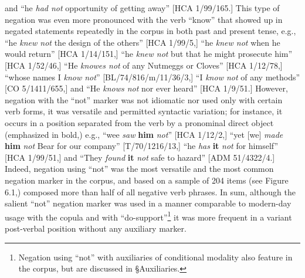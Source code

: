 \begin{styleStandard}
[HCA 1/9/4,] and “he \textit{had not} opportunity of getting away” [HCA 1/99/165.] This type of negation was even more pronounced with the verb “know” that showed up in negated statements repeatedly in the corpus in both past and present tense, e.g., “he \textit{knew not} the design of the others” [HCA 1/99/5,] “he \textit{knew not} when he would return” [HCA 1/14/151,] “he \textit{knew not} but that he might prosecute him” [HCA 1/52/46,] “He \textit{knowes not} of any Nutmeggs or Cloves” [HCA 1/12/78,] “whose names I \textit{know not}” [BL/74/816/m/11/36/3,] “I \textit{know not} of any methods” [CO 5/1411/655,] and “He \textit{knows not} nor ever heard” [HCA 1/9/51.] However, negation with the “not” marker was not idiomatic nor used only with certain verb forms, it was versatile and permitted syntactic variation; for instance, it occurs in a position separated from the verb by a pronominal direct object (emphasized in bold,) e.g., “wee \textit{saw}\textbf{\textit{ }}\textbf{him} \textit{not}” [HCA 1/12/2,] “yet [we] \textit{made }\textbf{him} \textit{not} Bear for our company” [T/70/1216/13,] “he \textit{has}\textbf{ it} \textit{not} for himself” [HCA 1/99/51,] and “They \textit{found}\textbf{ it} \textit{not} safe to hazard” [ADM 51/4322/4.] Indeed, negation using “not” was the most versatile and the most common negation marker in the corpus, and based on a sample of 204 items (see Figure 6.1,) composed more than half of all negative verb phrases. In sum, although the salient “not” negation marker was used in a manner comparable to modern-day usage with the copula and with “do-support”\footnote{ Negation using “not” with auxiliaries of conditional modality also feature in the corpus, but are discussed in §Auxiliaries.} it was more frequent in a variant post-verbal position without any auxiliary marker.
\end{styleStandard}

\begin{styleStandard}

\end{styleStandard}

